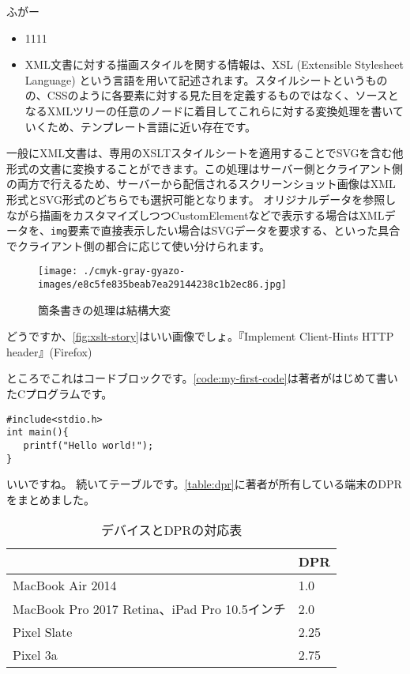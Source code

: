 ふがー
\begin{itemize}
  \item 1111
  \item XML文書に対する描画スタイルを関する情報は、XSL (Extensible Stylesheet Language) という言語を用いて記述されます。スタイルシートというものの、CSSのように各要素に対する見た目を定義するものではなく、ソースとなるXMLツリーの任意のノードに着目してこれらに対する変換処理を書いていくため、テンプレート言語に近い存在です。
\end{itemize}

一般にXML文書は、専用のXSLTスタイルシートを適用することでSVGを含む他形式の文書に変換することができます。この処理はサーバー側とクライアント側の両方で行えるため、サーバーから配信されるスクリーンショット画像はXML形式とSVG形式のどちらでも選択可能となります。
オリジナルデータを参照しながら描画をカスタマイズしつつCustomElementなどで表示する場合はXMLデータを、{\tt img}要素で直接表示したい場合はSVGデータを要求する、といった具合でクライアント側の都合に応じて使い分けられます。\\

\begin{figure}[h]
  \begin{center}
     \texttt{[image: ./cmyk-gray-gyazo-images/e8c5fe835beab7ea29144238c1b2ec86.jpg]}
     \caption{箇条書きの処理は結構大変}
     \label{fig:xslt-story}
  \end{center}
\end{figure}

どうですか、\autoref{fig:xslt-story}はいい画像でしょ。『Implement Client-Hints HTTP header』(Firefox)\par
ところでこれはコードブロックです。\autoref{code:my-first-code}は著者がはじめて書いたCプログラムです。
\begin{lstlisting}[frame=tb,label=code:my-first-code,caption=my\_first\_code.c]
#include<stdio.h>
int main(){
   printf("Hello world!");
}
\end{lstlisting}

いいですね。
続いてテーブルです。\autoref{table:dpr}に著者が所有している端末のDPRをまとめました。
\begin{table}[htb]
\begin{center}
  \caption{デバイスとDPRの対応表}
  \label{table:dpr}
  \begin{tabular}{|l|l|} \hline
     & DPR \\ \hline
    MacBook Air 2014 & 1.0 \\
    MacBook Pro 2017 Retina、iPad Pro 10.5インチ & 2.0 \\
    Pixel Slate & 2.25 \\
    Pixel 3a & 2.75 \\ \hline
  \end{tabular}
\end{center}
\end{table}

